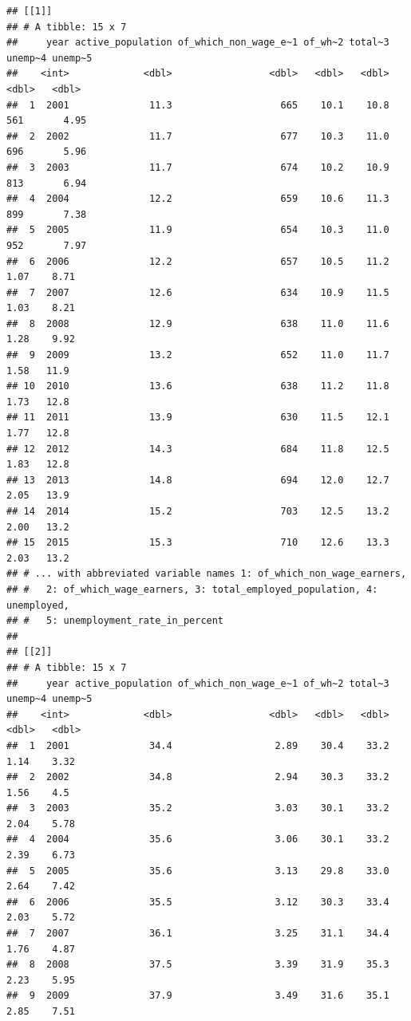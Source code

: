 \documentclass[
]{article}
\begin{document}
\begin{verbatim}
## [[1]]
## # A tibble: 15 x 7
##     year active_population of_which_non_wage_e~1 of_wh~2 total~3 unemp~4 unemp~5
##    <int>             <dbl>                 <dbl>   <dbl>   <dbl>   <dbl>   <dbl>
##  1  2001              11.3                   665    10.1    10.8  561       4.95
##  2  2002              11.7                   677    10.3    11.0  696       5.96
##  3  2003              11.7                   674    10.2    10.9  813       6.94
##  4  2004              12.2                   659    10.6    11.3  899       7.38
##  5  2005              11.9                   654    10.3    11.0  952       7.97
##  6  2006              12.2                   657    10.5    11.2    1.07    8.71
##  7  2007              12.6                   634    10.9    11.5    1.03    8.21
##  8  2008              12.9                   638    11.0    11.6    1.28    9.92
##  9  2009              13.2                   652    11.0    11.7    1.58   11.9 
## 10  2010              13.6                   638    11.2    11.8    1.73   12.8 
## 11  2011              13.9                   630    11.5    12.1    1.77   12.8 
## 12  2012              14.3                   684    11.8    12.5    1.83   12.8 
## 13  2013              14.8                   694    12.0    12.7    2.05   13.9 
## 14  2014              15.2                   703    12.5    13.2    2.00   13.2 
## 15  2015              15.3                   710    12.6    13.3    2.03   13.2 
## # ... with abbreviated variable names 1: of_which_non_wage_earners,
## #   2: of_which_wage_earners, 3: total_employed_population, 4: unemployed,
## #   5: unemployment_rate_in_percent
## 
## [[2]]
## # A tibble: 15 x 7
##     year active_population of_which_non_wage_e~1 of_wh~2 total~3 unemp~4 unemp~5
##    <int>             <dbl>                 <dbl>   <dbl>   <dbl>   <dbl>   <dbl>
##  1  2001              34.4                  2.89    30.4    33.2    1.14    3.32
##  2  2002              34.8                  2.94    30.3    33.2    1.56    4.5 
##  3  2003              35.2                  3.03    30.1    33.2    2.04    5.78
##  4  2004              35.6                  3.06    30.1    33.2    2.39    6.73
##  5  2005              35.6                  3.13    29.8    33.0    2.64    7.42
##  6  2006              35.5                  3.12    30.3    33.4    2.03    5.72
##  7  2007              36.1                  3.25    31.1    34.4    1.76    4.87
##  8  2008              37.5                  3.39    31.9    35.3    2.23    5.95
##  9  2009              37.9                  3.49    31.6    35.1    2.85    7.51

\end{verbatim}
\end{document}
